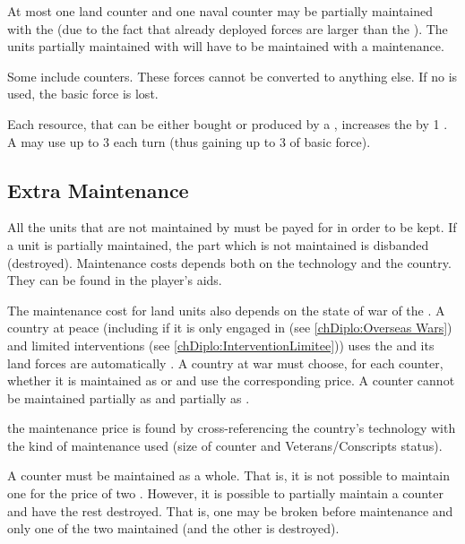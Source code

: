 \aparag At most one land counter and one naval counter may be partially
maintained with the  (due to the fact that already
deployed forces are larger than the ).
\bparag The units partially maintained with  will have to
be maintained with a  maintenance.

\aparag Some  include \corsaire counters. These forces
cannot be converted to anything else. If no \corsaire is used, the basic force
is lost.

\label{chLogistic:Effect of Wood Maintenance} Each
 resource, that can be either bought or produced by a \MAJ,
increases the  by 1 \ND.
\bparag A \MAJ may use up to 3  each turn (thus gaining up to 3\ND
of basic force).



\subsection{Extra Maintenance}

\aparag All the units that are not maintained by  must be
payed for in order to be kept.
\bparag If a unit is partially maintained, the part which is not maintained is
disbanded (destroyed).
\bparag Maintenance costs depends both on the technology and the country. They
can be found in the player's aids.

\aparag The maintenance cost for land units also depends on the state of war
of the \MAJ.
\bparag A country at peace (including if it is only engaged in  (see \ref{chDiplo:Overseas Wars}) and limited interventions (see
\ref{chDiplo:InterventionLimitee})) uses the  and its
land forces are automatically .
\bparag A country at war must choose, for each counter, whether it is
maintained as  or  and use the corresponding
price.
\bparag A counter cannot be maintained partially as  and
partially as .

\aparag the maintenance price is found by cross-referencing the country's
technology with the kind of maintenance used (size of counter and
Veterans/Conscripts status).

\aparag A counter must be maintained as a whole. That is, it is not possible
to maintain one \ARMY\Facemoins for the price of two \LD.
\bparag However, it is possible to partially maintain a counter and have the
rest destroyed. That is, one \ARMY\Facemoins may be broken before maintenance
and only one of the two \LD maintained (and the other is destroyed).

